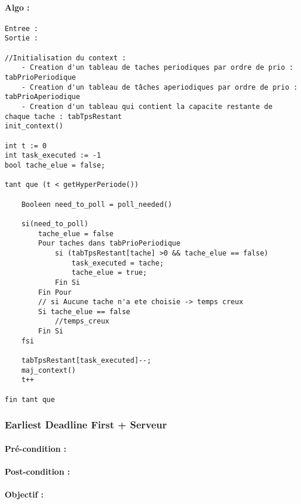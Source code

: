 				\paragraph{Algo :} 
					\begin{verbatim}
Entree : 
Sortie :  

//Initialisation du context : 
	- Creation d'un tableau de taches periodiques par ordre de prio : tabPrioPeriodique
	- Creation d'un tableau de tâches aperiodiques par ordre de prio : tabPrioAperiodique
	- Creation d'un tableau qui contient la capacite restante de chaque tache : tabTpsRestant
init_context()

int t := 0
int task_executed := -1
bool tache_elue = false;

tant que (t < getHyperPeriode())
	
    Booleen need_to_poll = poll_needed()
	
    si(need_to_poll)
        tache_elue = false
        Pour taches dans tabPrioPeriodique
        	si (tabTpsRestant[tache] >0 && tache_elue == false)
        		task_executed = tache;
        		tache_elue = true;
        	Fin Si 
        Fin Pour
        // si Aucune tache n'a ete choisie -> temps creux
        Si tache_elue == false
        	//temps_creux
        Fin Si
    fsi
	
	tabTpsRestant[task_executed]--;
    maj_context()
    t++
	
fin tant que
					\end{verbatim}
					
					
			\subsubsection{Earliest Deadline First + Serveur}
			
				\paragraph{Pré-condition :} 
				\paragraph{Post-condition :} 
				\paragraph{Objectif :} 
